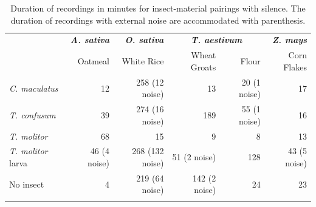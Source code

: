 \begin{table}[!htbp]
	\caption{Duration of recordings in minutes for insect-material pairings with silence. The duration of recordings with external noise are accommodated with parenthesis. \label{tab:recording}}
	\centering
	\begin{tabular}{lrrrrr}
		\toprule
		                          & \textbf{\textit{A. sativa}} & \textbf{\textit{O. sativa}} & \multicolumn{2}{c}{\textbf{\textit{T. aestivum}}} & \textbf{\textit{Z. mays}}                \\
		                          & Oatmeal                        & White Rice                     & Wheat Groats                                            & Flour                      & Corn Flakes  \\
		\midrule
		\textit{C. maculatus}     & 12                             & 258 (12 noise)                 & 13                                                      & 20 (1 noise)               & 17           \\
		\textit{T. confusum}      & 39                             & 274 (16 noise)                 & 189                                                     & 55 (1 noise)               & 16           \\
		\textit{T. molitor}       & 68                             & 15                             & 9                                                       & 8                          & 13           \\
		\textit{T. molitor} larva & 46 (4 noise)                   & 268 (132 noise)                & 51 (2 noise)                                            & 128                        & 43 (5 noise) \\
		\midrule
		No insect                 & 4                              & 219 (64 noise)                 & 142 (2 noise)                                           & 24                         & 23           \\
		\bottomrule                                                                                                                                                                                       \\
	\end{tabular}
\end{table}

